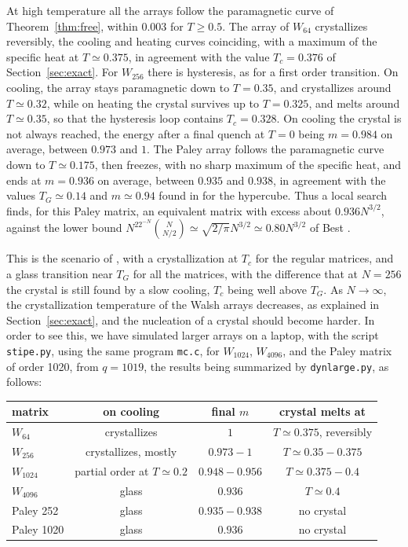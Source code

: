 \documentclass[11pt,a4paper]{article}
\theoremstyle{remark}
\begin{document}
At high temperature all the arrays follow the paramagnetic curve of Theorem~\ref{thm:free}, within $0.003$ for $T\geq0.5$. The array of $W_{64}$ crystallizes reversibly, the cooling and heating curves coinciding, with a maximum of the specific heat at $T\simeq0.375$, in agreement with the value $T_c=0.376$ of Section~\ref{sec:exact}. For $W_{256}$ there is hysteresis, as for a first order transition. On cooling, the array stays paramagnetic down to $T=0.35$, and crystallizes around $T\simeq0.32$, while on heating the crystal survives up to $T=0.325$, and melts around $T\simeq0.35$, so that the hysteresis loop contains $T_c=0.328$. On cooling the crystal is not always reached, the energy after a final quench at $T=0$ being $m=0.984$ on average, between $0.973$ and $1$. The Paley array follows the paramagnetic curve down to $T\simeq0.175$, then freezes, with no sharp maximum of the specific heat, and ends at $m=0.936$ on average, between $0.935$ and $0.938$, in agreement with the values $T_G\simeq0.14$ and $m\simeq0.94$ found in \cite{mp3} for the hypercube. Thus a local search finds, for this Paley matrix, an equivalent matrix with excess about $0.936N^{3/2}$, against the lower bound $N^22^{-N}\binom{N}{N/2}\simeq\sqrt{2/\pi}N^{3/2}\simeq0.80N^{3/2}$ of Best \cite{bes}.

This is the scenario of \cite{mp2}, with a crystallization at $T_c$ for the regular matrices, and a glass transition near $T_G$ for all the matrices, with the difference that at $N=256$ the crystal is still found by a slow cooling, $T_c$ being well above $T_G$. As $N\to\infty$, the crystallization temperature of the Walsh arrays decreases, as explained in Section~\ref{sec:exact}, and the nucleation of a crystal should become harder. In order to see this, we have simulated larger arrays on a laptop, with the script \texttt{stipe.py}, using the same program \texttt{mc.c}, for $W_{1024}$, $W_{4096}$, and the Paley matrix of order 1020, from $q=1019$, the results being summarized by \texttt{dynlarge.py}, as follows:

\begin{center}
\begin{tabular}{|l|c|c|c|}
\hline
matrix & on cooling & final $m$ & crystal melts at\\
\hline
$W_{64}$ & crystallizes & $1$ & $T\simeq0.375$, reversibly\\
$W_{256}$ & crystallizes, mostly & $0.973-1$ & $T\simeq0.35-0.375$\\
$W_{1024}$ & partial order at $T\simeq0.2$ & $0.948-0.956$ & $T\simeq0.375-0.4$\\
$W_{4096}$ & glass & $0.936$ & $T\simeq0.4$\\
Paley 252 & glass & $0.935-0.938$ & no crystal\\
Paley 1020 & glass & $0.936$ & no crystal\\
\hline
\end{tabular}
\end{center}
\end{document}
